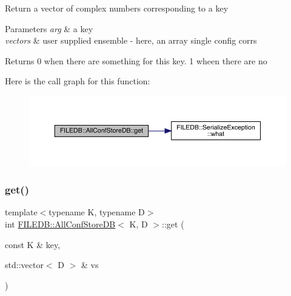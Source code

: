 Return a vector of complex numbers corresponding to a key 
\begin{DoxyParams}{Parameters}
{\em arg} & a key \\
\hline
{\em vectors} & user supplied ensemble -\/ here, an array single config corrs \\
\hline
\end{DoxyParams}
\begin{DoxyReturn}{Returns}
0 when there are something for this key. 1 wheen there are no 
\end{DoxyReturn}
Here is the call graph for this function\+:
\nopagebreak
\begin{figure}[H]
\begin{center}
\leavevmode
\includegraphics[width=350pt]{df/db6/classFILEDB_1_1AllConfStoreDB_a848466f7dce25cacc4e8560c50240d35_cgraph}
\end{center}
\end{figure}
\mbox{\label{classFILEDB_1_1AllConfStoreDB_a848466f7dce25cacc4e8560c50240d35}} 
\subsubsection{\texorpdfstring{get()}{get()}\hspace{0.1cm}{\footnotesize\ttfamily [2/2]}}
{\footnotesize\ttfamily template$<$typename K, typename D$>$ \\
int \mbox{\hyperlink{classFILEDB_1_1AllConfStoreDB}{F\+I\+L\+E\+D\+B\+::\+All\+Conf\+Store\+DB}}$<$ K, D $>$\+::get (\begin{DoxyParamCaption}\item[{const K \&}]{key,  }\item[{std\+::vector$<$ D $>$ \&}]{vs }\end{DoxyParamCaption})\hspace{0.3cm}{\ttfamily [inline]}}

